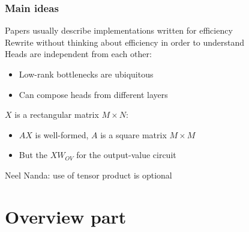 \documentclass{beamer}
\begin{document}
\begin{frame}

  \frametitle{Main ideas}

Papers usually describe implementations written for efficiency\\[2ex]

Rewrite without thinking about efficiency in order to understand\\[2ex]

Heads are independent from each other:\\[2ex]

\begin{itemize}
   \item Low-rank bottlenecks are ubiquitous 
   \item Can compose heads from different layers\\[2ex]
\end{itemize}

$X$ is a rectangular matrix $M\times N$:\\[2ex]

\begin{itemize}
  \item $A X$ is well-formed, $A$ is a square matrix $M\times M$
  \item But the $X W_{OV}$ for the output-value circuit\\[2ex]
\end{itemize}

Neel Nanda: use of tensor product is optional

\end{frame}

\section{Overview part}
\end{document}
